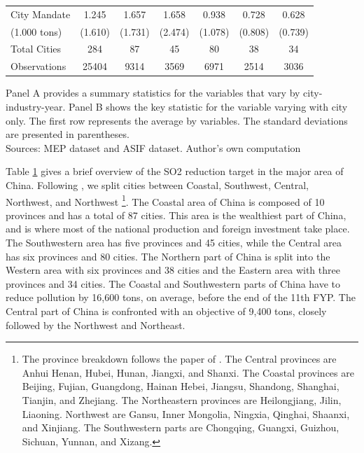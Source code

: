 \documentclass[12pt]{article}
\begin{document}
\begin{table}[hbt!]
{\begin{threeparttable}
\begin{tabular}{l*{6}{c}}
    City Mandate &	1.245&	1.657&	1.658&	0.938&	0.728	&0.628\\
    (1.000 tons)&	(1.610)&	(1.731)&	(2.474)	&(1.078)	&(0.808)	&(0.739)\\
    \bottomrule
    
    Total Cities&	284&	87&	45&	80	&38	&34\\
    Observations &	25404&	9314&	3569&	6971&	2514&	3036\\
    \hline
  \end{tabular}
  \begin{tablenotes}
      \small
      \item Panel A provides a summary statistics for the variables that vary by city-industry-year. Panel B shows the key statistic for the variable varying with city only. The first row represents the average by variables. The standard deviations are presented in parentheses. \\
      Sources: MEP dataset and ASIF dataset. Author's own computation 
    \end{tablenotes}
\label{tab:table1}
\end{threeparttable}}
\end{table} 

Table \ref{tab:table1} gives a brief overview of the SO2 reduction target in the major area of China. Following \cite{Wu2017-bl}, we split cities between Coastal, Southwest, Central, Northwest, and Northwest \footnote{The province breakdown follows the paper of \cite{Wu2017-bl}. The Central provinces are Anhui
Henan, Hubei, Hunan, Jiangxi, and Shanxi. The Coastal provinces are Beijing, Fujian, Guangdong, Hainan Hebei, Jiangsu, Shandong, Shanghai, Tianjin, and Zhejiang. The Northeastern provinces are Heilongjiang, Jilin, Liaoning. Northwest are Gansu, Inner Mongolia, Ningxia, Qinghai, Shaanxi, and Xinjiang. The Southwestern parts are Chongqing, Guangxi, Guizhou, Sichuan, Yunnan, and Xizang.}. The Coastal area of China is composed of 10 provinces and has a total of 87 cities. This area is the wealthiest part of China, and is where most of the national production and foreign investment take place. The Southwestern area has five provinces and 45 cities, while the Central area has six provinces and 80 cities. The Northern part of China is split into the Western area with six provinces and 38 cities and the Eastern area with three provinces and 34 cities. The Coastal and Southwestern parts of China have to reduce pollution by 16,600 tons, on average, before the end of the 11th FYP. The Central part of China is confronted with an objective of 9,400 tons, closely followed by the Northwest and Northeast.
\end{document}
